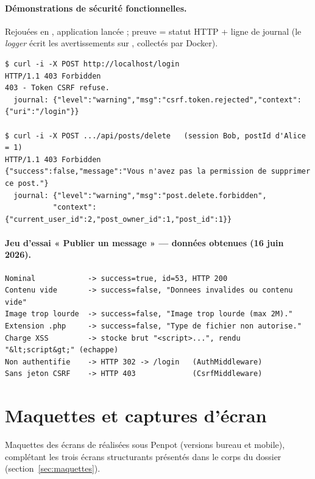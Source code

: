 \paragraph{Démonstrations de sécurité fonctionnelles.} Rejouées en , application
lancée ; preuve = statut HTTP + ligne de journal (le \emph{logger} écrit les avertissements sur
, collectés par Docker).

\begin{lstlisting}[style=text, caption={CSRF (POST sans jeton) et IDOR (Bob supprime un message d'Alice)}]
$ curl -i -X POST http://localhost/login
HTTP/1.1 403 Forbidden
403 - Token CSRF refuse.
  journal: {"level":"warning","msg":"csrf.token.rejected","context":{"uri":"/login"}}

$ curl -i -X POST .../api/posts/delete   (session Bob, postId d'Alice = 1)
HTTP/1.1 403 Forbidden
{"success":false,"message":"Vous n'avez pas la permission de supprimer ce post."}
  journal: {"level":"warning","msg":"post.delete.forbidden",
           "context":{"current_user_id":2,"post_owner_id":1,"post_id":1}}
\end{lstlisting}

\paragraph{Jeu d'essai « Publier un message » — données obtenues (16 juin 2026).}

\begin{lstlisting}[style=text, caption={Réponses obtenues pour les sept cas}]
Nominal            -> success=true, id=53, HTTP 200
Contenu vide       -> success=false, "Donnees invalides ou contenu vide"
Image trop lourde  -> success=false, "Image trop lourde (max 2M)."
Extension .php     -> success=false, "Type de fichier non autorise."
Charge XSS         -> stocke brut "<script>...", rendu "&lt;script&gt;" (echappe)
Non authentifie    -> HTTP 302 -> /login   (AuthMiddleware)
Sans jeton CSRF    -> HTTP 403             (CsrfMiddleware)
\end{lstlisting}

\section{Maquettes et captures d'écran}
\label{ann:maquettes}

Maquettes des écrans de \projet{} réalisées sous Penpot (versions bureau et mobile), complétant
les trois écrans structurants présentés dans le corps du dossier (section~\ref{sec:maquettes}).

